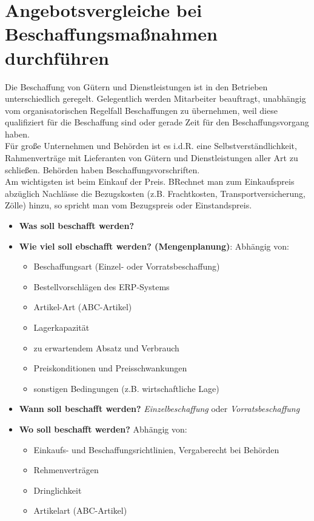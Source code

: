 \documentclass[a4paper, 12pt]{report}
\begin{document}

\section{Angebotsvergleiche bei Beschaffungsmaßnahmen durchführen}

Die Beschaffung von Gütern und Dienstleistungen ist in den Betrieben
unterschiedlich geregelt. Gelegentlich werden Mitarbeiter beauftragt, unabhängig
vom organisatorischen Regelfall Beschaffungen zu übernehmen, weil diese
qualifiziert für die Beschaffung sind oder gerade Zeit für den
Beschaffungsvorgang haben. \\

Für große Unternehmen und Behörden ist es i.d.R. eine Selbstverständlichkeit,
Rahmenverträge mit Lieferanten von Gütern und Dienstleistungen aller Art zu
schließen. Behörden haben Beschaffungsvorschriften. \\

Am wichtigsten ist beim Einkauf der Preis. BRechnet man zum Einkaufspreis
abzüglich Nachlässe die Bezugskosten (z.B. Frachtkosten, Transportversicherung,
Zölle) hinzu, so spricht man vom Bezugspreis oder Einstandspreis. \\

\begin{itemize}
    \item \textbf{Was soll beschafft werden?}
    \item \textbf{Wie viel soll ebschafft werden? (Mengenplanung)}: Abhängig
	von:
    \begin{itemize}
	\item Beschaffungsart (Einzel- oder Vorratsbeschaffung)
	\item Bestellvorschlägen des ERP-Systems
	\item Artikel-Art (ABC-Artikel)
	\item Lagerkapazität
	\item zu erwartendem Absatz und Verbrauch
	\item Preiskonditionen und Preisschwankungen
	\item sonstigen Bedingungen (z.B. wirtschaftliche Lage)
    \end{itemize}
    \item \textbf{Wann soll beschafft werden?} \emph{Einzelbeschaffung} oder
	\emph{Vorratsbeschaffung}
    \item \textbf{Wo soll beschafft werden?} Abhängig von:
    \begin{itemize}
	\item Einkaufs- und Beschaffungsrichtlinien, Vergaberecht bei Behörden
	\item Rehmenverträgen
	\item Dringlichkeit
	\item Artikelart (ABC-Artikel)
    \end{itemize}
\end{itemize}
\end{document}
